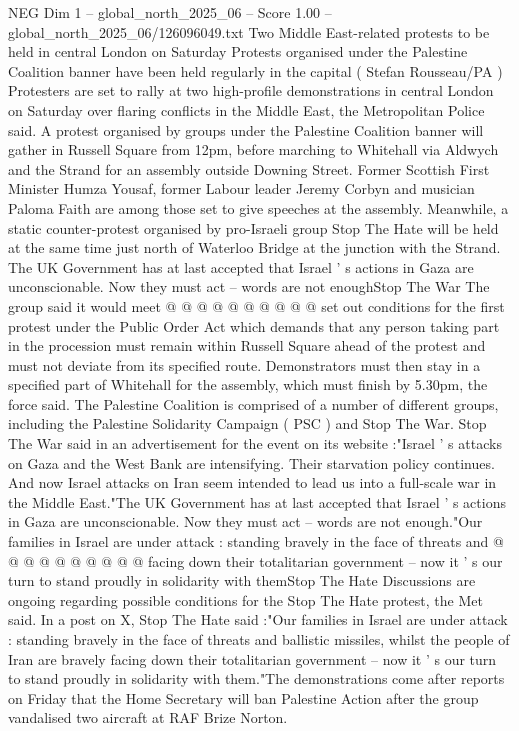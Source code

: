 \begin{textsample}{NEG Dim 1 – global\_north\_2025\_06 – Score 1.00 – global\_north\_2025\_06/126096049.txt}  \label{ex:f1_neg_148}
Two Middle East-related protests to be held in central London on Saturday Protests organised under the Palestine Coalition banner have been held regularly in the capital ( Stefan Rousseau/PA ) Protesters are set to rally at two high-profile demonstrations in central London on Saturday over flaring conflicts in the Middle East, the Metropolitan Police said.
A protest organised by groups under the Palestine Coalition banner will gather in Russell Square from 12pm, before marching to Whitehall via Aldwych and the Strand for an assembly outside Downing Street.
Former Scottish First Minister Humza Yousaf, former Labour leader Jeremy Corbyn and musician Paloma Faith are among those set to give speeches at the assembly.
Meanwhile, a static counter-protest organised by pro-Israeli group Stop The Hate will be held at the same time just north of Waterloo Bridge at the junction with the Strand.
The UK Government has at last accepted that Israel ' s actions in Gaza are unconscionable.
Now they must act -- words are not enoughStop The War The group said it would meet @ @ @ @ @ @ @ @ @ @ set out conditions for the first protest under the Public Order Act which demands that any person taking part in the procession must remain within Russell Square ahead of the protest and must not deviate from its specified route.
Demonstrators must then stay in a specified part of Whitehall for the assembly, which must finish by 5.30pm, the force said.
The Palestine Coalition is comprised of a number of different groups, including the Palestine Solidarity Campaign ( PSC ) and Stop The War.
Stop The War said in an advertisement for the event on its website :"Israel ' s attacks on Gaza and the West Bank are intensifying.
Their starvation policy continues.
And now Israel attacks on Iran seem intended to lead us into a full-scale war in the Middle East."The UK Government has at last accepted that Israel ' s actions in Gaza are unconscionable.
Now they must act -- words are not enough."Our families in Israel are under attack : standing bravely in the face of threats and @ @ @ @ @ @ @ @ @ @ facing down their totalitarian government -- now it ' s our turn to stand proudly in solidarity with themStop The Hate Discussions are ongoing regarding possible conditions for the Stop The Hate protest, the Met said.
In a post on X, Stop The Hate said :"Our families in Israel are under attack : standing bravely in the face of threats and ballistic missiles, whilst the people of Iran are bravely facing down their totalitarian government -- now it ' s our turn to stand proudly in solidarity with them."The demonstrations come after reports on Friday that the Home Secretary will ban Palestine Action after the group vandalised two aircraft at RAF Brize Norton.

\end{textsample}
